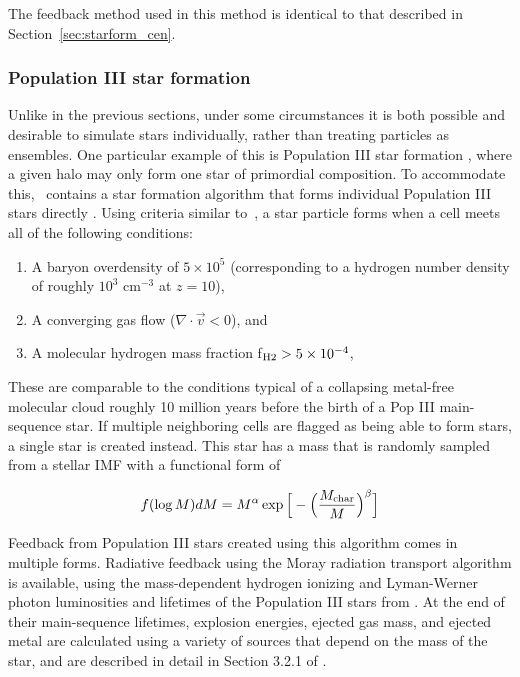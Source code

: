 The feedback method used in this method is identical to that described
in Section~\ref{sec:starform_cen}.

\subsubsection{Population III star formation}
\label{sec:starform_pop3}

Unlike in the previous sections, under some circumstances it is both
possible and desirable to simulate stars individually, rather than
treating particles as ensembles.  One particular example of this is
Population III star formation
\citep{ABN02,2007ApJ...654...66O,2008ApJ...685...40W,2009Sci...325..601T},
where a given halo may only form one star of primordial composition.
To accommodate this, \enzo\ contains a star formation algorithm that
forms individual Population III stars directly \citep{2007ApJ...659L..87A,
  2008ApJ...685...40W, 2012MNRAS.427..311W}.  Using criteria similar
to~\citet{CO1992}, a star particle forms when a cell meets all of the
following conditions:

\begin{enumerate}
\item A baryon overdensity of $5 \times 10^5$ (corresponding to a
  hydrogen number density of 
  roughly $10^3$ cm$^{-3}$ at $z=10$),

\item A converging gas flow ($\nabla \cdot \vec{v} < 0$), and

\item A molecular hydrogen mass fraction f$_{\rm H2} > 5 \times 10^{-4}$,
\end{enumerate}

These are comparable to the conditions typical of a collapsing metal-free molecular cloud roughly
10 million years before the birth of a Pop III main-sequence star.  If
multiple neighboring cells are flagged as being able to form stars, a
single star is created instead.  This star has a mass that is randomly
sampled from a stellar IMF with a functional form of

\begin{equation}
f(\log M) dM = M^{\alpha} \exp \Big[ -\Big( \frac{M_{\rm char}}{M}
\Big)^{\beta} \Big]
\end{equation}

Feedback from Population III stars created using this algorithm comes in multiple forms.
Radiative feedback using the Moray radiation transport algorithm
\citep{Wise11_Moray} is available, using the mass-dependent hydrogen
ionizing and Lyman-Werner photon luminosities and lifetimes of the
Population III stars from \citet{2002A&A...382...28S}.  At the end of
their main-sequence lifetimes, explosion energies, ejected gas mass,
and ejected metal are calculated using a variety of sources that
depend on the mass of the star, and are described in detail in Section
3.2.1 of \citet{2012MNRAS.427..311W}.


